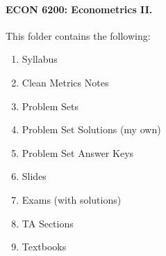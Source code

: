 \documentclass[12pt]{article}
\begin{document}
	
	\paragraph{ECON 6200: Econometrics II.} This folder contains the following:
	\begin{enumerate}
		\item Syllabus
		\item Clean Metrics Notes
		\item Problem Sets
		\item Problem Set Solutions (my own)
		\item Problem Set Answer Keys
		\item Slides
		\item Exams (with solutions)
		\item TA Sections
		\item Textbooks
	\end{enumerate}
	
	
	
	
	
	
	
	
	
	
	
	
	
	
	
	
	
	
	
	
\end{document}
